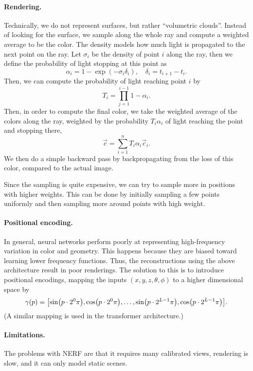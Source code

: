\paragraph{Rendering.}

Technically, we do not represent surfaces, but rather ``volumetric clouds''. Instead of looking for
the surface, we sample along the whole ray and compute a weighted average to be the color. The
density models how much light is propagated to the next point on the ray. Let $\sigma_i$ be the
density of point $i$ along the ray, then we define the probability of light stopping at this point
as \[
    \alpha_i = 1 - \exp(-\sigma_i \delta_i), \quad \delta_i = t_{i+1} - t_i.
\]
Then, we can compute the probability of light reaching point $i$ by \[
    T_i = \prod_{j=1}^{i-1} 1 - \alpha_i.
\]
Then, in order to compute the final color, we take the weighted average of the colors along the
ray, weighted by the probability $T_i \alpha_i$ of light reaching the point and stopping there, \[
    \vec{c} = \sum_{i=1}^{n} T_i \alpha_i \vec{c}_i.
\]
We then do a simple backward pass by backpropagating from the loss of this color, compared to the
actual image.

Since the sampling is quite expensive, we can try to sample more in positions with higher weights.
This can be done by initially sampling a few points uniformly and then sampling more around points
with high weight.

\paragraph{Positional encoding.}

In general, neural networks perform poorly at representing high-frequency variation in color and
geometry. This happens because they are biased toward learning lower frequency functions. Thus, the
reconstructions using the above architecture result in poor renderings. The solution to this is to
introduce positional encodings, mapping the inputs $(x,y,z,\theta,\phi)$ to a higher dimensional
space by \[
    \gamma(p) = \lft[\sin\lft(p \cdot 2^0 \pi\rgt), \cos\lft(p \cdot 2^0 \pi\rgt), \ldots, \sin\lft(p \cdot 2^{L-1} \pi\rgt), \cos\lft(p \cdot 2^{L-1} \pi\rgt)\rgt].
\]
(A similar mapping is used in the transformer architecture.)

\paragraph{Limitations.}

The problems with NERF are that it requires many calibrated views, rendering is slow, and it can
only model static scenes.
